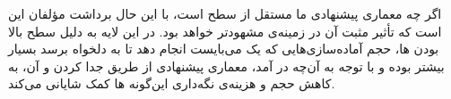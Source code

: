 اگر چه معماری پیشنهادی ما مستقل از سطح  است، با این حال برداشت مؤلفان این است که تأثیر مثبت آن در زمینه‌ی  مشهودتر خواهد بود. در این لایه به دلیل سطح بالا بودن ‌ها، حجم آماده‌سازی‌هایی که یک  می‌بایست انجام دهد تا به  دلخواه برسد بسیار بیشتر بوده و با توجه به آن‌چه در  آمد، معماری پیشنهادی از طریق جدا کردن  و  آن، به کاهش حجم و هزینه‌ی نگه‌داری این‌گونه ‌ها کمک شایانی می‌کند.

